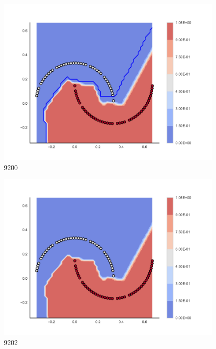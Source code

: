 \begin{subfigure}[b]{0.09\textwidth}
    \includegraphics[clip, trim=2.35cm 1.75cm 4.5cm 0cm,width=\textwidth]{img/convergence/9200.pdf}
    \caption{9200}
    \label{fig:convergence_9200}
\end{subfigure}
%
\begin{subfigure}[b]{0.09\textwidth}
    \includegraphics[clip, trim=2.35cm 1.75cm 4.5cm 0cm,width=\textwidth]{img/convergence/9202.pdf}
    \caption{9202}
    \label{fig:convergence_9202}
\end{subfigure}
%
